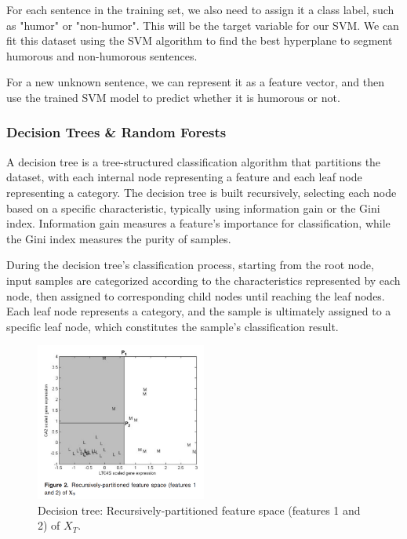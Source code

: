\documentclass[a4paper]{article}
\begin{document}
For each sentence in the training set, we also need to assign it a class label, such as "humor" or "non-humor". This will be the target variable for our SVM. We can fit this dataset using the SVM algorithm to find the best hyperplane to segment humorous and non-humorous sentences.

For a new unknown sentence, we can represent it as a feature vector, and then use the trained SVM model to predict whether it is humorous or not.

\subsubsection{Decision Trees \& Random Forests}

A decision tree is a tree-structured classification algorithm that partitions the dataset, with each internal node representing a feature and each leaf node representing a category. The decision tree is built recursively, selecting each node based on a specific characteristic, typically using information gain or the Gini index. Information gain measures a feature's importance for classification, while the Gini index measures the purity of samples.

During the decision tree's classification process, starting from the root node, input samples are categorized according to the characteristics represented by each node, then assigned to corresponding child nodes until reaching the leaf nodes. Each leaf node represents a category, and the sample is ultimately assigned to a specific leaf node, which constitutes the sample's classification result.

\begin{figure}[H]
	\centering
	\includegraphics[width=0.5\textwidth]{./images/Decision tree-Recursively-partitioned feature space.png}
	\caption{Decision tree: Recursively-partitioned feature space (features 1 and 2) of $X_T$.}
	\label{fig.Decision tree-data[An introduction to decision tree modeling]}
\end{figure}
\end{document}
